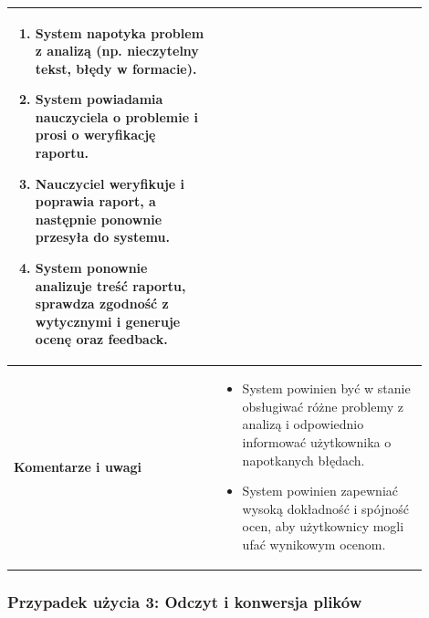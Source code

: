 \documentclass[a4paper, 12pt]{article}
\begin{document}
\begin{table}[H]
\begin{tabular}{|p{0.45\linewidth}|p{0.45\linewidth}|}
\begin{enumerate}
    \item System napotyka problem z analizą (np. nieczytelny tekst, błędy w formacie).
    \item System powiadamia nauczyciela o problemie i prosi o weryfikację raportu.
    \item Nauczyciel weryfikuje i poprawia raport, a następnie ponownie przesyła do systemu.
    \item System ponownie analizuje treść raportu, sprawdza zgodność z wytycznymi i generuje ocenę oraz feedback.
\end{enumerate} \\
\hline
\textbf{Komentarze i uwagi} &
\begin{itemize}
    \item System powinien być w stanie obsługiwać różne problemy z analizą i odpowiednio informować użytkownika o napotkanych błędach.
    \item System powinien zapewniać wysoką dokładność i spójność ocen, aby użytkownicy mogli ufać wynikowym ocenom.
\end{itemize} \\
\hline
\end{tabular}
\end{table}

\subsubsection{Przypadek użycia 3: Odczyt i konwersja plików}
\end{document}
